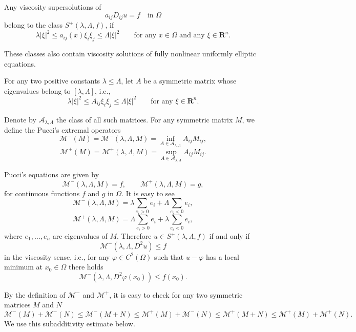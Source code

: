 \begin{remark}\label{hanlin:ch05-rem-5-5} Any viscosity supersolutions of
\[
a_{ij}D_{ij}u=f \quad \text{in }\Omega
\]
belong to the class $S^+(\lambda,\Lambda,f)$, if
\[
\lambda |\xi|^2 \le a_{ij}(x)\xi_i\xi_j \le \Lambda |\xi|^2
\qquad \text{for any } x\in\Omega \text{ and any } \xi\in\mathbf{R}^n.
\]

These classes also contain viscosity solutions of fully nonlinear uniformly elliptic equations.

\end{remark}
\begin{example}\label{hanlin:ch05-ex-5-6} For any two positive constants $\lambda \le \Lambda$, let $A$ be a symmetric matrix whose eigenvalues belong to $[\lambda,\Lambda]$, i.e.,
\[
\lambda |\xi|^2 \le A_{ij}\xi_i\xi_j \le \Lambda |\xi|^2
\qquad \text{for any } \xi\in\mathbf{R}^n.
\]

Denote by $\mathcal{A}_{\lambda,\Lambda}$ the class of all such matrices. For any symmetric matrix $M$, we define the Pucci's extremal operators
\[
\mathcal{M}^-(M)=\mathcal{M}^-(\lambda,\Lambda,M)=\inf_{A\in\mathcal{A}_{\lambda,\Lambda}} A_{ij}M_{ij},
\]
\[
\mathcal{M}^+(M)=\mathcal{M}^+(\lambda,\Lambda,M)=\sup_{A\in\mathcal{A}_{\lambda,\Lambda}} A_{ij}M_{ij}.
\]

Pucci's equations are given by
\[
\mathcal{M}^-(\lambda,\Lambda,M)=f, \qquad \mathcal{M}^+(\lambda,\Lambda,M)=g,
\]
for continuous functions $f$ and $g$ in $\Omega$. It is easy to see
\[
\mathcal{M}^-(\lambda,\Lambda,M)=\lambda\sum_{e_i>0} e_i+\Lambda\sum_{e_i<0} e_i,
\]
\[
\mathcal{M}^+(\lambda,\Lambda,M)=\Lambda\sum_{e_i>0} e_i+\lambda\sum_{e_i<0} e_i,
\]
where $e_1,\dots,e_n$ are eigenvalues of $M$. Therefore $u\in S^+(\lambda,\Lambda,f)$ if and only if
\[
\mathcal{M}^-(\lambda,\Lambda,D^2u)\le f
\]
in the viscosity sense, i.e., for any $\varphi\in C^2(\Omega)$ such that $u-\varphi$ has a local minimum at $x_0\in\Omega$ there holds
\[
\mathcal{M}^-(\lambda,\Lambda,D^2\varphi(x_0))\le f(x_0).
\]

By the definition of $\mathcal{M}^-$ and $\mathcal{M}^+$, it is easy to check for any two symmetric matrices $M$ and $N$
\[
\mathcal{M}^-(M)+\mathcal{M}^-(N)\le \mathcal{M}^-(M+N)\le \mathcal{M}^+(M)+\mathcal{M}^-(N)
\le \mathcal{M}^+(M+N)\le \mathcal{M}^+(M)+\mathcal{M}^+(N).
\]
We use this subadditivity estimate below.

\end{example}

